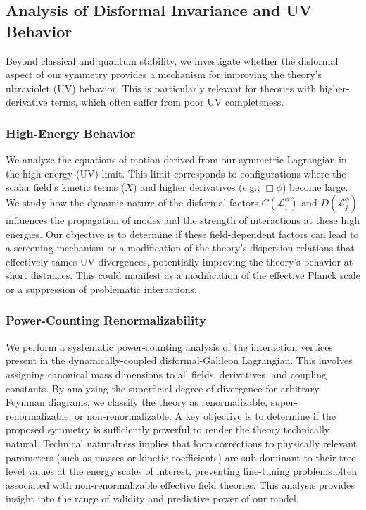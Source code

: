 \documentclass[twocolumn]{aastex631}
\begin{document}
\begin{itemize}
\subsection{Analysis of Disformal Invariance and UV Behavior}

Beyond classical and quantum stability, we investigate whether the disformal aspect of our symmetry provides a mechanism for improving the theory's ultraviolet (UV) behavior. This is particularly relevant for theories with higher-derivative terms, which often suffer from poor UV completeness.

\subsubsection{High-Energy Behavior}
We analyze the equations of motion derived from our symmetric Lagrangian in the high-energy (UV) limit. This limit corresponds to configurations where the scalar field's kinetic terms ($X$) and higher derivatives (e.g., $\Box\phi$) become large. We study how the dynamic nature of the disformal factors $C(\mathcal{L}_i^\phi)$ and $D(\mathcal{L}_j^\phi)$ influences the propagation of modes and the strength of interactions at these high energies. Our objective is to determine if these field-dependent factors can lead to a screening mechanism or a modification of the theory's dispersion relations that effectively tames UV divergences, potentially improving the theory's behavior at short distances. This could manifest as a modification of the effective Planck scale or a suppression of problematic interactions.

\subsubsection{Power-Counting Renormalizability}
We perform a systematic power-counting analysis of the interaction vertices present in the dynamically-coupled disformal-Galileon Lagrangian. This involves assigning canonical mass dimensions to all fields, derivatives, and coupling constants. By analyzing the superficial degree of divergence for arbitrary Feynman diagrams, we classify the theory as renormalizable, super-renormalizable, or non-renormalizable. A key objective is to determine if the proposed symmetry is sufficiently powerful to render the theory technically natural. Technical naturalness implies that loop corrections to physically relevant parameters (such as masses or kinetic coefficients) are sub-dominant to their tree-level values at the energy scales of interest, preventing fine-tuning problems often associated with non-renormalizable effective field theories. This analysis provides insight into the range of validity and predictive power of our model.


\end{itemize}
\end{document}
